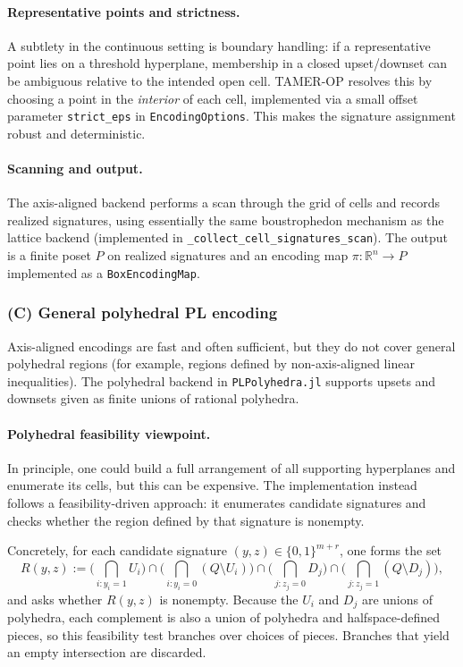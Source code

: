 \documentclass{article}
\newcommand{\<}{\langle}
\renewcommand{\>}{\rangle}
\theoremstyle{definition}
\theoremstyle{remark}
\begin{document}
	\paragraph{Representative points and strictness.}
	A subtlety in the continuous setting is boundary handling: if a representative point
	lies on a threshold hyperplane, membership in a closed upset/downset can be ambiguous
	relative to the intended open cell.  TAMER-OP resolves this by choosing a point in the
	\emph{interior} of each cell, implemented via a small offset parameter
	\texttt{strict\_eps} in \texttt{EncodingOptions}.  This makes the signature assignment
	robust and deterministic.
	
	\paragraph{Scanning and output.}
	The axis-aligned backend performs a scan through the grid of cells and records
	realized signatures, using essentially the same boustrophedon mechanism as the lattice
	backend (implemented in \texttt{\_collect\_cell\_signatures\_scan}).
	The output is a finite poset $P$ on realized signatures and an encoding map
	$\pi\colon \mathbb{R}^n\to P$ implemented as a \texttt{BoxEncodingMap}.
	
	\subsubsection*{(C) General polyhedral PL encoding}
	\label{subsubsec:encoding-PL-polyhedra}
	
	Axis-aligned encodings are fast and often sufficient, but they do not cover
	general polyhedral regions (for example, regions defined by non-axis-aligned linear
	inequalities).  The polyhedral backend in \texttt{PLPolyhedra.jl} supports upsets and
	downsets given as finite unions of rational polyhedra.
	
	\paragraph{Polyhedral feasibility viewpoint.}
	In principle, one could build a full arrangement of all supporting hyperplanes and
	enumerate its cells, but this can be expensive.  The implementation instead follows
	a feasibility-driven approach: it enumerates candidate signatures and checks whether
	the region defined by that signature is nonempty.
	
	Concretely, for each candidate signature $(y,z)\in\{0,1\}^{m+r}$, one forms the set
	\[
	R(y,z) :=
	\Big(\bigcap_{i:y_i=1} U_i\Big)
	\cap
	\Big(\bigcap_{i:y_i=0} (Q\setminus U_i)\Big)
	\cap
	\Big(\bigcap_{j:z_j=0} D_j\Big)
	\cap
	\Big(\bigcap_{j:z_j=1} (Q\setminus D_j)\Big),
	\]
	and asks whether $R(y,z)$ is nonempty.  Because the $U_i$ and $D_j$ are unions of
	polyhedra, each complement is also a union of polyhedra and halfspace-defined pieces,
	so this feasibility test branches over choices of pieces.  Branches that yield an empty
	intersection are discarded.
	
\end{document}
